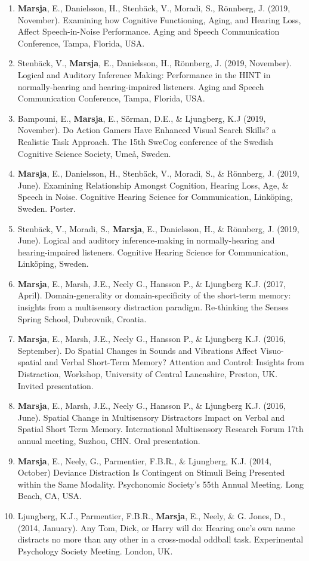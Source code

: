 \documentclass[]{article}
\begin{document}
\begin{enumerate}
\def\labelenumi{\arabic{enumi}.}
\item
  \textbf{Marsja}, E., Danielsson, H., Stenbäck, V., Moradi, S.,
  Rönnberg, J. (2019, November). Examining how Cognitive Functioning,
  Aging, and Hearing Loss, Affect Speech-in-Noise Performance. Aging and
  Speech Communication Conference, Tampa, Florida, USA.
\item
  Stenbäck, V., \textbf{Marsja}, E., Danielsson, H., Rönnberg, J. (2019,
  November). Logical and Auditory Inference Making: Performance in the
  HINT in normally-hearing and hearing-impaired listeners. Aging and
  Speech Communication Conference, Tampa, Florida, USA.
\item
  Bampouni, E., \textbf{Marsja}, E., Sörman, D.E., \& Ljungberg, K.J
  (2019, November). Do Action Gamers Have Enhanced Visual Search Skills?
  a Realistic Task Approach. The 15th SweCog conference of the Swedish
  Cognitive Science Society, Umeå, Sweden.
\item
  \textbf{Marsja}, E., Danielsson, H., Stenbäck, V., Moradi, S., \&
  Rönnberg, J. (2019, June). Examining Relationship Amongst Cognition,
  Hearing Loss, Age, \& Speech in Noise. Cognitive Hearing Science for
  Communication, Linköping, Sweden. Poster.
\item
  Stenbäck, V., Moradi, S., \textbf{Marsja}, E., Danielsson, H., \&
  Rönnberg, J. (2019, June). Logical and auditory inference-making in
  normally-hearing and hearing-impaired listeners. Cognitive Hearing
  Science for Communication, Linköping, Sweden.
\item
  \textbf{Marsja}, E., Marsh, J.E., Neely G., Hansson P., \& Ljungberg
  K.J. (2017, April). Domain-generality or domain-specificity of the
  short-term memory: insights from a multisensory distraction paradigm.
  Re-thinking the Senses Spring School, Dubrovnik, Croatia.
\item
  \textbf{Marsja}, E., Marsh, J.E., Neely G., Hansson P., \& Ljungberg
  K.J. (2016, September). Do Spatial Changes in Sounds and Vibrations
  Affect Visuo-spatial and Verbal Short-Term Memory? Attention and
  Control: Insights from Distraction, Workshop, University of Central
  Lancashire, Preston, UK. Invited presentation.
\item
  \textbf{Marsja}, E., Marsh, J.E., Neely G., Hansson P., \& Ljungberg
  K.J. (2016, June). Spatial Change in Multisensory Distractors Impact
  on Verbal and Spatial Short Term Memory. International Multisensory
  Research Forum 17th annual meeting, Suzhou, CHN. Oral presentation.
\item
  \textbf{Marsja}, E., Neely, G., Parmentier, F.B.R., \& Ljungberg, K.J.
  (2014, October) Deviance Distraction Is Contingent on Stimuli Being
  Presented within the Same Modality. Psychonomic Society's 55th Annual
  Meeting. Long Beach, CA, USA.
\item
  Ljungberg, K.J., Parmentier, F.B.R., \textbf{Marsja}, E., Neely, \& G.
  Jones, D., (2014, January). Any Tom, Dick, or Harry will do: Hearing
  one's own name distracts no more than any other in a cross-modal
  oddball task. Experimental Psychology Society Meeting. London, UK.
\end{enumerate}
\end{document}
